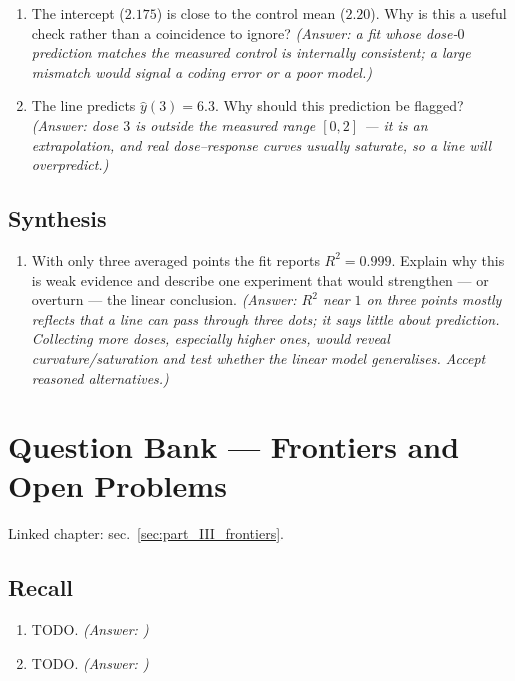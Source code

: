\documentclass[
]{article}
\providecommand{\tightlist}{%
  \setlength{\itemsep}{0pt}\setlength{\parskip}{0pt}}
\theoremstyle{plain}
\theoremstyle{definition}
\begin{document}
\begin{enumerate}
\def\labelenumi{\arabic{enumi}.}
\setcounter{enumi}{2}
\tightlist
\item
  The intercept (\(2.175\)) is close to the control mean (\(2.20\)). Why
  is this a useful check rather than a coincidence to ignore?
  \emph{(Answer: a fit whose dose-\(0\) prediction matches the measured
  control is internally consistent; a large mismatch would signal a
  coding error or a poor model.)}
\item
  The line predicts \(\widehat{y}(3) = 6.3\). Why should this prediction
  be flagged? \emph{(Answer: dose \(3\) is outside the measured range
  \([0, 2]\) --- it is an extrapolation, and real dose--response curves
  usually saturate, so a line will overpredict.)}
\end{enumerate}

\subsection{Synthesis}\label{synthesis-10}

\begin{enumerate}
\def\labelenumi{\arabic{enumi}.}
\setcounter{enumi}{4}
\tightlist
\item
  With only three averaged points the fit reports \(R^2 = 0.999\).
  Explain why this is weak evidence and describe one experiment that
  would strengthen --- or overturn --- the linear conclusion.
  \emph{(Answer: \(R^2\) near \(1\) on three points mostly reflects that
  a line can pass through three dots; it says little about prediction.
  Collecting more doses, especially higher ones, would reveal
  curvature/saturation and test whether the linear model generalises.
  Accept reasoned alternatives.)}
\end{enumerate}

\newpage

\section{Question Bank --- Frontiers and Open
Problems}\label{sec:q_part_III_frontiers}

Linked chapter: sec.~\ref{sec:part_III_frontiers}.

\subsection{Recall}\label{recall-11}

\begin{enumerate}
\def\labelenumi{\arabic{enumi}.}
\item
  TODO. \emph{(Answer: )}
\item
  TODO. \emph{(Answer: )}
\end{enumerate}
\end{document}
